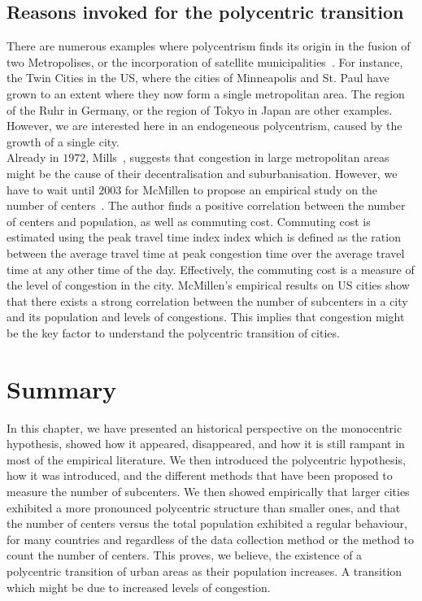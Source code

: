 \subsection{Reasons invoked for the polycentric transition}
\label{sec:reasons_invoked_for_the_polycentric_transition}

There are numerous examples where polycentrism finds its origin in the fusion of two
Metropolises, or the incorporation of satellite municipalities~\cite{LeNechet:2015}. For instance, the Twin Cities in the US, where the cities of
Minneapolis and St. Paul have grown to an extent where they now form a single
metropolitan area. The region of the Ruhr in Germany, or the region of Tokyo in
Japan are other examples. However, we are interested here in an endogeneous
polycentrism, caused by the growth of a single city.\\

Already in $1972$, Mills~\cite{Mills:1972}, suggests that congestion in large
metropolitan areas might be the cause of their decentralisation and
suburbanisation. However, we have to wait until $2003$ for McMillen to propose
an empirical study on the number of centers~\cite{McMillen:2003}. The author
finds a positive correlation between the number of centers and population, as
well as commuting cost. Commuting cost is estimated using the peak travel time
index index which is defined as the ration between the average travel time at
peak congestion time over the average travel time at any other time of the day.
Effectively, the commuting cost is a measure of the level of congestion in the
city. McMillen's empirical results on US cities show that there exists a strong
correlation between the number of subcenters in a city and its population and
levels of congestions. This implies that congestion might be the key factor to
understand the polycentric transition of cities.

\section{Summary}
\label{sec:summary}

In this chapter, we have presented an historical perspective on the monocentric
hypothesis, showed how it appeared, disappeared, and how it is still rampant in
most of the empirical literature. We then introduced the polycentric hypothesis,
how it was introduced, and the different methods that have been proposed to
measure the number of subcenters. We then showed empirically that larger cities exhibited a
more pronounced polycentric structure than smaller ones, and that the number of
centers versus the total population exhibited a regular behaviour, for many
countries and regardless of the data collection method or the method to count
the number of centers. This proves, we believe, the existence of a polycentric
transition of urban areas as their population increases. A transition which
might be due to increased levels of congestion.

